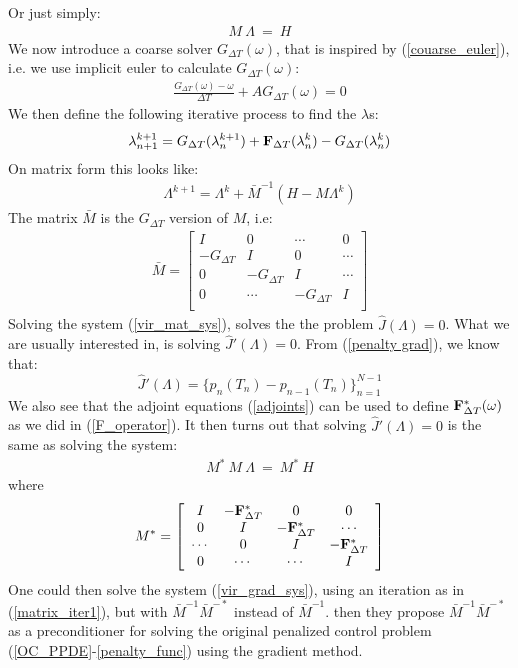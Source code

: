 \documentclass[11pt,a4paper]{article}
\begin{document}
Or just simply:
\begin{align}
M \ \Lambda \ = \ H \label{vir_mat_sys}
\end{align}
We now introduce a coarse solver $G_{\Delta T}(\omega)$, that is inspired by (\ref{couarse_euler}), i.e. we use implicit euler to calculate $G_{\Delta T}(\omega)$:
\begin{align}
\frac{G_{\Delta T}(\omega) -\omega }{\Delta T } + A G_{\Delta T}(\omega) = 0
\end{align}  
We then define the following iterative process to find the $\lambda$s:
\begin{align}
\lambda_{n+1}^{k+1} = G_{\Delta T}(\lambda_{n}^{k+1}) + \bold{F}_{\Delta T}(\lambda_{n}^{k})-G_{\Delta T}(\lambda_{n}^{k})
\end{align} 
On matrix form this looks like:
\begin{align}
\Lambda^{k+1} = \Lambda^k + \bar{M}^{-1}(H-M\Lambda^k) \label{matrix_iter1}
\end{align}
The matrix $\bar{M}$ is the $G_{\Delta T}$ version of $M$, i.e:
\begin{align}
\bar{M} = \left[ \begin{array}{cccc}
   I & 0 & \cdots & 0 \\  
   -G_{\Delta T} & I & 0 & \cdots \\ 
   0 &-G_{\Delta T} & I  & \cdots \\
   0 &\cdots &-G_{\Delta T} & I   \\
   \end{array}  \right]
\end{align}
Solving the system (\ref{vir_mat_sys}), solves the the problem $\hat{J}(\Lambda)=0$. What we are usually interested in, is solving $\hat{J}'(\Lambda)=0$. From (\ref{penalty grad}), we know that: $$\hat{J}'(\Lambda) = \{p_n(T_n)-p_{n-1}(T_n)\}_{n=1}^{N-1}$$ We also see that the adjoint equations (\ref{adjoints}) can be used to define $\bold{F}_{\Delta T}^*(\omega)$ as we did in (\ref{F_operator}). It then turns out that solving $\hat{J}'(\Lambda)=0$ is the same as solving the system:
\begin{align}
M^* \ M \ \Lambda \ = \ M^* \ H \label{vir_grad_sys}
\end{align}
where 
\begin{align}
M^*= \left[ \begin{array}{cccc}
   I & -\bold{F}_{\Delta T}^* & 0 & 0 \\  
   0 & I & -\bold{F}_{\Delta T}^* & \cdots \\ 
   \cdots &0 & I  & -\bold{F}_{\Delta T}^* \\
   0 &\cdots &\cdots & I   \\
   \end{array}  \right]
\end{align}
One could then solve the system (\ref{vir_grad_sys}), using an iteration as in (\ref{matrix_iter1}), but with $\bar{M}^{-1}\bar{M}^{-*}$ instead of $\bar{M}^{-1}$. \cite{maday2002parareal} then they propose $\bar{M}^{-1}\bar{M}^{-*}$ as a preconditioner for solving the original penalized control problem (\ref{OC_PPDE}-\ref{penalty_func}) using the gradient method. 
\end{document}
